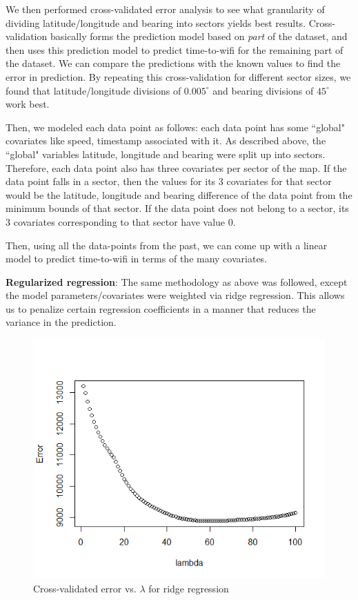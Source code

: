 \documentclass[12pt, fleqn]{article}
\begin{document}
We then performed cross-validated error analysis to see what granularity of 
dividing latitude/longitude and bearing into sectors yields best results. Cross-validation 
basically forms the prediction model based on \emph{part} of the dataset, and then 
uses this prediction model to predict time-to-wifi for the remaining part of the dataset. We can 
compare the predictions with the known values to find the error in prediction. 
By repeating this cross-validation for different sector sizes, we found that 
latitude/longitude divisions of $0.005^\circ$ and bearing divisions of $45^\circ$ work best.
 
Then, we modeled each data point as follows: each data point has some ``global" 
covariates like speed, timestamp associated with it. As described above, the ``global" variables
latitude, longitude and bearing were split up into sectors. Therefore, each data point also has 
three covariates per sector of the map. If the data point falls in a sector, 
then the values for its 3 covariates for that sector would be the latitude, 
longitude and bearing difference of the data point from the minimum bounds of 
that sector. If the data point does not belong to a sector, its 3 covariates 
corresponding to that sector have value 0. 

Then, using all the data-points from the past, we can come up with a linear model 
to predict time-to-wifi in terms of the many covariates. 

\bigskip
\textbf{Regularized regression}:	The same methodology as above was followed, except 
the model parameters/covariates were weighted via ridge regression. This allows 
us to penalize certain regression coefficients in a manner that reduces the variance in the 
prediction.

\medskip
\begin{figure}[htp]
\centering
\includegraphics[scale=0.5]{img/ridge_lambda.png}
\caption{Cross-validated error vs. $\lambda$ for ridge regression\label{fig-ridge-lambda}}
\end{figure}
\medskip
\end{document}
